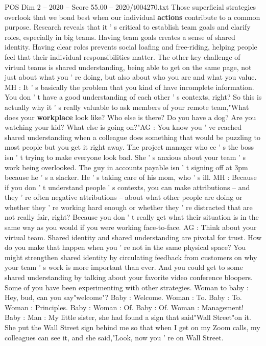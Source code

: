 \begin{textsample}{POS Dim 2 – 2020 – Score 55.00 – 2020/t004270.txt}
Those superficial strategies overlook that we bond best when our individual \textbf{actions} contribute to a common purpose.
Research reveals that it ' s critical to establish team goals and clarify roles, especially in big teams.
Having team goals creates a sense of shared identity.
Having clear roles prevents social loafing and free-riding, helping people feel that their individual responsibilities matter.
The other key challenge of virtual teams is shared understanding, being able to get on the same page, not just about what you ' re doing, but also about who you are and what you value.
MH : It ' s basically the problem that you kind of have incomplete information.
You don ' t have a good understanding of each other ' s contexts, right?
So this is actually why it ' s really valuable to ask members of your remote team,"What does your \textbf{workplace} look like?
Who else is there?
Do you have a dog?
Are you watching your kid?
What else is going on?"AG : You know you ' ve reached shared understanding when a colleague does something that would be puzzling to most people but you get it right away.
The project manager who cc ' s the boss isn ' t trying to make everyone look bad.
She ' s anxious about your team ' s work being overlooked.
The guy in accounts payable isn ' t signing off at 3pm because he ' s a slacker.
He ' s taking care of his mom, who ' s ill.
MH : Because if you don ' t understand people ' s contexts, you can make attributions -- and they ' re often negative attributions -- about what other people are doing or whether they ' re working hard enough or whether they ' re distracted that are not really fair, right?
Because you don ' t really get what their situation is in the same way as you would if you were working face-to-face.
AG : Think about your virtual team.
Shared identity and shared understanding are pivotal for trust.
How do you make that happen when you ' re not in the same physical space?
You might strengthen shared identity by circulating feedback from customers on why your team ' s work is more important than ever.
And you could get to some shared understanding by talking about your favorite video conference bloopers.
Some of you have been experimenting with other strategies.
Woman to baby : Hey, bud, can you say"welcome"?
Baby : Welcome.
Woman : To.
Baby : To.
Woman : Principles.
Baby : Woman : Of.
Baby : Of.
Woman : Management!
Baby : Man : My little sister, she had found a sign that said"Wall Street"on it.
She put the Wall Street sign behind me so that when I get on my Zoom calls, my colleagues can see it, and she said,"Look, now you ' re on Wall Street.

\end{textsample}

